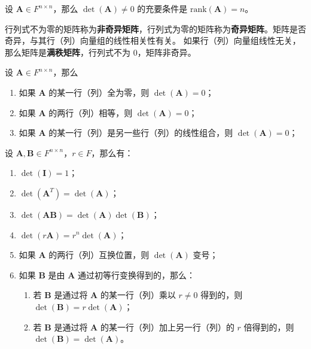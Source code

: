 \vspace{1em}

\begin{proposition}[行列式不为零的充要条件]
    设 $\mathbf{A} \in F^{n \times n}$，那么 $\det(\mathbf{A}) \neq 0$ 的充要条件是 $\mathrm{rank}(\mathbf{A}) = n$。
    \label{prop:det_nonzero_iff_full_rank}
\end{proposition}
\begin{note}
    行列式不为零的矩阵称为\textbf{非奇异矩阵}，行列式为零的矩阵称为\textbf{奇异矩阵}。矩阵是否奇异，与其行（列）向量组的线性相关性有关。
    如果行（列）向量组线性无关，那么矩阵是\textbf{满秩矩阵}，行列式不为 0，矩阵非奇异。
\end{note}

\begin{corollary}
    设 $\mathbf{A} \in F^{n \times n}$，那么
    \begin{enumerate}
        \item 如果 $\mathbf{A}$ 的某一行（列）全为零，则 $\det(\mathbf{A}) = 0$；
        \item 如果 $\mathbf{A}$ 的两行（列）相等，则 $\det(\mathbf{A}) = 0$；
        \item 如果 $\mathbf{A}$ 的某一行（列）是另一些行（列）的线性组合，则 $\det(\mathbf{A}) = 0$；
    \end{enumerate}
\end{corollary}

\vspace{1em}

\begin{proposition}[行列式的性质]
    设 $\mathbf{A},\mathbf{B} \in F^{n \times n}$，$r\in F$，那么有：
    \begin{enumerate}
        \item $\det(\mathbf{I}) = 1$；
        \item $\det(\mathbf{A}^T) = \det(\mathbf{A})$；
        \item $\det(\mathbf{A}\mathbf{B}) = \det(\mathbf{A})\det(\mathbf{B})$；
        \item $\det(r\mathbf{A}) = r^n \det(\mathbf{A})$；
        \item 如果 $\mathbf{A}$ 的两行（列）互换位置，则 $\det(\mathbf{A})$ 变号；
        \item 如果 $\mathbf{B}$ 是由 $\mathbf{A}$ 通过初等行变换得到的，那么：
        \begin{enumerate}
            \item 若 $\mathbf{B}$ 是通过将 $\mathbf{A}$ 的某一行（列）乘以 $r\neq 0$ 得到的，则 $\det(\mathbf{B}) = r\det(\mathbf{A})$；
            \item 若 $\mathbf{B}$ 是通过将 $\mathbf{A}$ 的某一行（列）加上另一行（列）的 $r$ 倍得到的，则 $\det(\mathbf{B}) = \det(\mathbf{A})$。
        \end{enumerate}
    \end{enumerate}
\end{proposition}
\vspace{1em}

